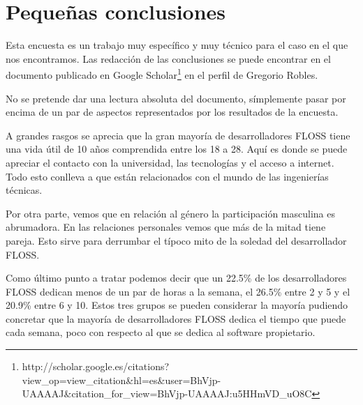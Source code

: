 \documentclass[11pt]{article}
\begin{document}
\section{Peque\~nas conclusiones}

\par Esta encuesta es un trabajo muy espec\'ifico y muy t\'ecnico para el caso en el que nos encontramos. Las redacci\'on de las conclusiones se puede encontrar en el documento publicado en Google Scholar\footnote{http://scholar.google.es/citations?view\_op=view\_citation\&hl=es\&user=BhVjp-UAAAAJ\&citation\_for\_view=BhVjp-UAAAAJ:u5HHmVD\_uO8C} en el perfil de Gregorio Robles.

\par No se pretende dar una lectura absoluta del documento, s\'implemente pasar por encima de un par de aspectos representados por los resultados de la encuesta.

\par A grandes rasgos se aprecia que la gran mayor\'ia de desarrolladores FLOSS tiene una vida \'util de 10 a\~nos comprendida entre los 18 a 28. Aqu\'i es donde se puede apreciar el contacto con la universidad, las tecnolog\'ias y el acceso a internet. Todo esto conlleva a que est\'an relacionados con el mundo de las ingenier\'ias t\'ecnicas.

\par Por otra parte, vemos que en relaci\'on al g\'enero la participaci\'on masculina es abrumadora. En las relaciones personales vemos que m\'as de la mitad tiene pareja. Esto sirve para derrumbar el t\'ipoco mito de la soledad del desarrollador FLOSS.

\par Como \'ultimo punto a tratar podemos decir que un 22.5\% de los desarrolladores FLOSS dedican menos de un par de horas a la semana, el 26.5\% entre 2 y 5 y el 20.9\% entre 6 y 10. Estos tres grupos se pueden considerar la mayor\'ia pudiendo concretar que la mayor\'ia de desarrolladores FLOSS dedica el tiempo que puede cada semana, poco con respecto al que se dedica al software propietario.
\end{document}
